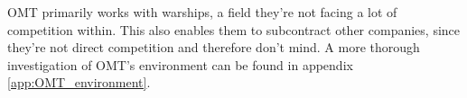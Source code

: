 OMT primarily works with warships, a field they're not facing a lot of competition within. 
This also enables them to subcontract other companies, since they're not direct competition and therefore don't mind.
A more thorough investigation of OMT's environment can be found in appendix \ref{app:OMT_environment}.